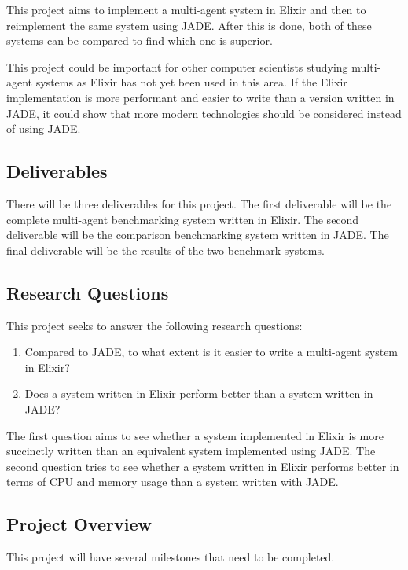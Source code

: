 This project aims to implement a multi-agent system in Elixir and then to reimplement the same system using JADE\@.
After this is done, both of these systems can be compared to find which one is superior.

This project could be important for other computer scientists studying multi-agent systems as Elixir has not yet been used in this area.
If the Elixir implementation is more performant and easier to write than a version written in JADE, it could show that more modern technologies should be considered instead of using JADE\@.

\subsection{Deliverables}

There will be three deliverables for this project.
The first deliverable will be the complete multi-agent benchmarking system written in Elixir.
The second deliverable will be the comparison benchmarking system written in JADE\@.
The final deliverable will be the results of the two benchmark systems.

\subsection{Research Questions}\label{sec:research_questions}

This project seeks to answer the following research questions:

\begin{enumerate}
    \item Compared to JADE, to what extent is it easier to write a multi-agent system in Elixir?
    \item Does a system written in Elixir perform better than a system written in JADE\@?
\end{enumerate}

The first question aims to see whether a system implemented in Elixir is more succinctly written than an equivalent system implemented using JADE\@.
The second question tries to see whether a system written in Elixir performs better in terms of CPU and memory usage than a system written with JADE\@.

\subsection{Project Overview}

This project will have several milestones that need to be completed.


